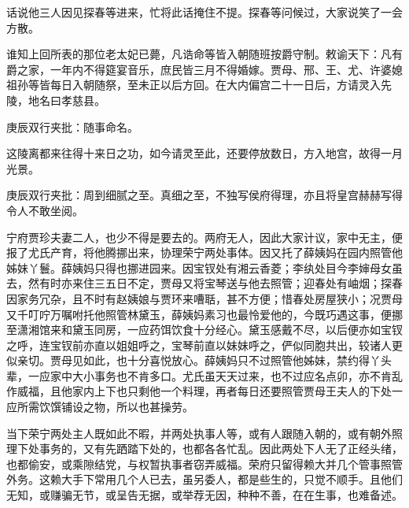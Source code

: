 \begin{parag}
    话说他三人因见探春等进来，忙将此话掩住不提。探春等问候过，大家说笑了一会方散。
\end{parag}


\begin{parag}
    谁知上回所表的那位老太妃已薨，凡诰命等皆入朝随班按爵守制。敕谕天下：凡有爵之家，一年内不得筵宴音乐，庶民皆三月不得婚嫁。贾母、邢、王、尤、许婆媳祖孙等皆每日入朝随祭，至未正以后方回。在大内偏宫二十一日后，方请灵入先陵，地名曰孝慈县。\begin{note}庚辰双行夹批：随事命名。\end{note}这陵离都来往得十来日之功，如今请灵至此，还要停放数日，方入地宫，故得一月光景。\begin{note}庚辰双行夹批：周到细腻之至。真细之至，不独写侯府得理，亦且将皇宫赫赫写得令人不敢坐阅。\end{note}宁府贾珍夫妻二人，也少不得是要去的。两府无人，因此大家计议，家中无主，便报了尤氏产育，将他腾挪出来，协理荣宁两处事体。因又托了薛姨妈在园内照管他姊妹丫鬟。薛姨妈只得也挪进园来。因宝钗处有湘云香菱；李纨处目今李婶母女虽去，然有时亦来住三五日不定，贾母又将宝琴送与他去照管；迎春处有岫烟；探春因家务冗杂，且不时有赵姨娘与贾环来嘈聒，甚不方便；惜春处房屋狭小；况贾母又千叮咛万嘱咐托他照管林黛玉，薛姨妈素习也最怜爱他的，今既巧遇这事，便挪至潇湘馆来和黛玉同房，一应药饵饮食十分经心。黛玉感戴不尽，以后便亦如宝钗之呼，连宝钗前亦直以姐姐呼之，宝琴前直以妹妹呼之，俨似同胞共出，较诸人更似亲切。贾母见如此，也十分喜悦放心。薛姨妈只不过照管他姊妹，禁约得丫头辈，一应家中大小事务也不肯多口。尤氏虽天天过来，也不过应名点卯，亦不肯乱作威福，且他家内上下也只剩他一个料理，再者每日还要照管贾母王夫人的下处一应所需饮馔铺设之物，所以也甚操劳。
\end{parag}


\begin{parag}
    当下荣宁两处主人既如此不暇，并两处执事人等，或有人跟随入朝的，或有朝外照理下处事务的，又有先跴踏下处的，也都各各忙乱。因此两处下人无了正经头绪，也都偷安，或乘隙结党，与权暂执事者窃弄威福。荣府只留得赖大并几个管事照管外务。这赖大手下常用几个人已去，虽另委人，都是些生的，只觉不顺手。且他们无知，或赚骗无节，或呈告无据，或举荐无因，种种不善，在在生事，也难备述。
\end{parag}


